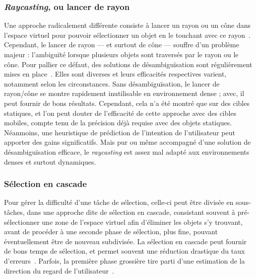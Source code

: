 	\subsubsection{\emph{Raycasting}, ou lancer de rayon}
    Une approche radicalement différente consiste à lancer un rayon ou un cône dans l'espace virtuel pour pouvoir sélectionner un objet en le \og touchant \fg{} avec ce rayon~\cite{liang1994jdcad}. Cependant, le lancer de rayon --- et surtout de cône --- souffre d'un problème majeur : l'ambiguïté lorsque plusieurs objets sont traversés par le rayon ou le cône. Pour pallier ce défaut, des solutions de désambiguïsation sont régulièrement mises en place~\cite{grossman2006design}. Elles sont diverses et leurs efficacités respectives varient, notamment selon les circonstances. Sans désambiguïsation, le lancer de rayon/cône se montre rapidement inutilisable en environnement dense ; avec, il peut fournir de bons résultats. Cependant, cela n'a été montré que sur des cibles statiques, et l'on peut douter de l'efficacité de cette approche avec des cibles mobiles, compte tenu de la précision déjà requise avec des objets statiques. Néanmoins, une heuristique de prédiction de l'intention de l'utilisateur peut apporter des gains significatifs. Mais pur ou même accompagné d'une solution de désambiguïsation efficace, le \emph{raycasting} est assez mal adapté aux environnements denses et surtout dynamiques.
    
	\subsubsection{Sélection en cascade}
    Pour gérer la difficulté d'une tâche de sélection, celle-ci peut être divisée en sous-tâches, dans une approche dite de sélection en cascade, consistant souvent à pré-sélectionner une zone de l'espace virtuel afin d'éliminer les objets s'y trouvant, avant de procéder à une seconde phase de sélection, plus fine, pouvant éventuellement être de nouveau subdivisée. La sélection en cascade peut fournir de bons temps de sélection, et permet souvent une réduction drastique du taux d'erreurs~\cite{kopper2011rapid}. Parfois, la première phase grossière tire parti d'une estimation de la direction du regard de l'utilisateur~\cite{debarba2013disambiguation}.
    
